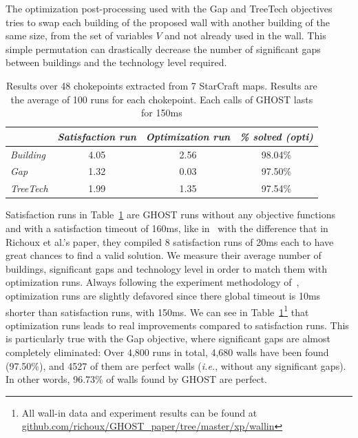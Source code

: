 \documentclass[journal]{IEEEtran}
\newcommand{\ghost}{\textsc{GHOST}\xspace}
\newcommand{\ie}{\textit{i.e.}}
\begin{document}
The  optimization  post-processing  used  with the  Gap  and  TreeTech
objectives  tries to  swap each  building  of the  proposed wall  with
another building of  the same size, from the set  of variables $V$ and
not already used in the  wall. This simple permutation can drastically
decrease  the number  of significant  gaps between  buildings and  the
technology level required.
\begin{table}[ht]
  \caption{Results  over 48  chokepoints  extracted  from 7  StarCraft
    maps. Results  are the  average of 100  runs for  each chokepoint.
    Each calls of \ghost lasts for 150ms} 
    \label{tab:wall}
    \centering
    \begin{tabular}{|l|c|c|c|}
      \cline{2-4}
      \multicolumn{1}{c|}{}   &    {\em   Satisfaction    run}&   {\em
        Optimization run}& {\em \% solved (opti)} \\
      \hline
      {\em Building} & 4.05 & 2.56 & 98.04\% \\
      {\em Gap} & 1.32 & 0.03 & 97.50\% \\ 
      {\em TreeTech} & 1.99 & 1.35 & 97.54\% \\ 
      \hline
    \end{tabular}  
\end{table}
Satisfaction runs in Table~\ref{tab:wall}  are \ghost runs without any
objective functions  and with  a satisfaction  timeout of  160ms, like
in~\cite{RichouxUO14}  with the  difference that  in Richoux  et al.'s
paper, they  compiled 8 satisfaction runs  of 20ms each to  have great
chances to find  a valid solution. We measure their  average number of
buildings, significant  gaps and  technology level  in order  to match
them  with   optimization  runs.   Always  following   the  experiment
methodology  of~\cite{RichouxUO14},  optimization  runs  are  slightly
defavored since there global timeout is 10ms shorter than satisfaction
runs,  with 150ms.  We  can  see in  Table~\ref{tab:wall}\footnote{All
  wall-in   data   and   experiment    results   can   be   found   at
  \href{https://github.com/richoux/GHOST\_paper/tree/master/xp/wallin}{github.com/richoux/GHOST\_paper/tree/master/xp/wallin}}
that  optimization  runs  leads   to  real  improvements  compared  to
satisfaction runs. This  is particularly true with  the Gap objective,
where significant  gaps are  almost completely eliminated:  Over 4,800
runs in total, 4,680 walls have been found (97.50\%), and 4527 of them
are perfect walls (\ie, without any significant gaps). In other words,
96.73\% of walls found by \ghost are perfect.
\end{document}
